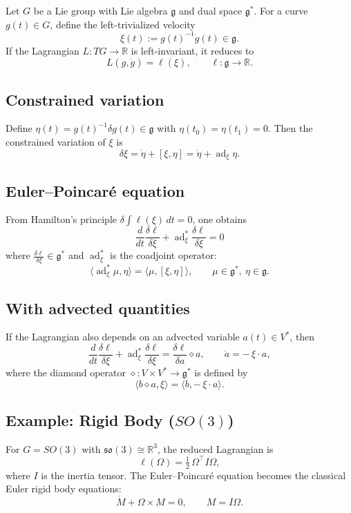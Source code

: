 \documentclass{article}
\begin{document}
Let $G$ be a Lie group with Lie algebra $\mathfrak{g}$ and dual space $\mathfrak{g}^*$.  
For a curve $g(t)\in G$, define the left-trivialized velocity
\[\xi(t) := g(t)^{-1}\dot g(t) \in \mathfrak{g}.\]
If the Lagrangian $L:TG\to\mathbb{R}$ is left-invariant, it reduces to 
\[L(g,\dot g) = \ell(\xi), \qquad \ell:\mathfrak{g}\to\mathbb{R}.\]

\subsection*{Constrained variation}
Define $\eta(t) = g(t)^{-1}\delta g(t)\in \mathfrak{g}$ with $\eta(t_0)=\eta(t_1)=0$.  
Then the constrained variation of $\xi$ is
\[\delta \xi = \dot\eta + [\xi,\eta] = \dot\eta + \operatorname{ad}_\xi \eta.\]

\subsection*{Euler--Poincar\'e equation}
From Hamilton's principle $\delta \int \ell(\xi)\,dt=0$, one obtains
\[\boxed{\;\frac{d}{dt}\frac{\delta \ell}{\delta \xi}
+ \operatorname{ad}^*_\xi \frac{\delta \ell}{\delta \xi} = 0\;}\]
where $\tfrac{\delta \ell}{\delta \xi}\in\mathfrak{g}^*$ and $\operatorname{ad}^*_\xi$ is the coadjoint operator:
\[\langle \operatorname{ad}^*_\xi \mu, \eta\rangle
= \langle \mu, [\xi,\eta]\rangle,
\qquad \mu\in \mathfrak{g}^*,\ \eta\in\mathfrak{g}.\]

\subsection*{With advected quantities}
If the Lagrangian also depends on an advected variable $a(t)\in V^*$, then
\[\frac{d}{dt}\frac{\delta \ell}{\delta \xi}
+ \operatorname{ad}^*_\xi \frac{\delta \ell}{\delta \xi}
= \frac{\delta \ell}{\delta a} \diamond a,
\qquad
\dot a = -\,\xi\cdot a,\]
where the diamond operator $\diamond : V \times V^* \to \mathfrak{g}^*$ is defined by
\[\langle b\diamond a, \xi \rangle = \langle b, -\,\xi\cdot a \rangle.\]

\subsection*{Example: Rigid Body ($SO(3)$)}
For $G=SO(3)$ with $\mathfrak{so}(3)\cong \mathbb{R}^3$,  
the reduced Lagrangian is
\[\ell(\Omega) = \tfrac12\, \Omega^\top I \Omega,\]
where $I$ is the inertia tensor.  
The Euler--Poincar\'e equation becomes the classical Euler rigid body equations:
\[\dot M + \Omega \times M = 0,
\qquad M = I\Omega.\] \cite{HolMarRat}
\end{document}
